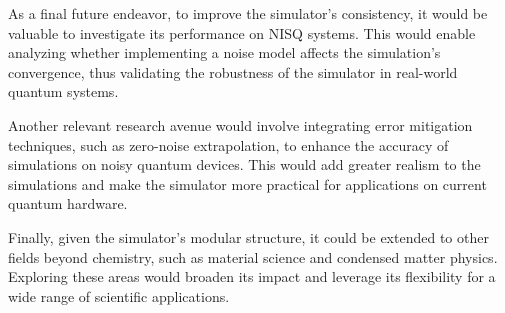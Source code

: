 As a final future endeavor, to improve the simulator's consistency, it would be valuable to investigate its performance on NISQ systems. This would enable analyzing whether implementing a noise model affects the simulation’s convergence, thus validating the robustness of the simulator in real-world quantum systems.

Another relevant research avenue would involve integrating error mitigation techniques, such as zero-noise extrapolation, to enhance the accuracy of simulations on noisy quantum devices. This would add greater realism to the simulations and make the simulator more practical for applications on current quantum hardware.

Finally, given the simulator’s modular structure, it could be extended to other fields beyond chemistry, such as material science and condensed matter physics. Exploring these areas would broaden its impact and leverage its flexibility for a wide range of scientific applications.